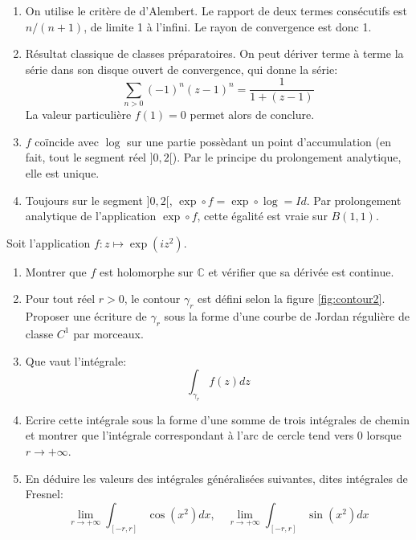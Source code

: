 \documentclass[a4paper, 12pt]{amsart}
\begin{document}
\begin{enumerate}
 \item On utilise le critère de d'Alembert. Le rapport de deux termes
consécutifs est $n/(n+1)$, de limite 1 à l'infini. Le rayon de convergence est
donc 1.
\item Résultat classique de classes préparatoires. On peut dériver terme à
terme la série dans son disque ouvert de convergence, qui donne la série:
\[
\sum_{n >0}(-1)^{n} (z-1)^n = \frac{1}{1+(z-1)}
\]
La valeur particulière $f(1)=0$ permet alors de conclure.
\item $f$ coïncide avec $\log$ sur une partie possèdant un point d'accumulation
(en fait, tout le segment réel $]0,2[$). Par le principe du prolongement
analytique, elle est unique.
\item Toujours sur le segment $]0,2[$, $\exp \circ f = \exp \circ \log = Id$.
Par prolongement analytique de l'application $\exp \circ f$, cette égalité est
vraie sur $B(1,1)$.
\end{enumerate}
\begin{fex}
 Soit l'application $f \colon z \mapsto \exp\left(i z^2\right)$. 
\begin{enumerate}
  \item Montrer que $f$ est holomorphe sur $\mathbb{C}$ et vérifier que sa
  dérivée est continue.
  \item Pour tout réel $r > 0$, le contour $\gamma_r$ est défini selon la figure
  \ref{fig:contour2}. Proposer une écriture de $\gamma_r$ sous la forme d'une
  courbe de Jordan régulière de classe $C^1$ par morceaux.
  \item Que vaut l'intégrale:
  \[
  \int_{\gamma_r} f(z) dz
  \]
  \item Ecrire cette intégrale sous la forme d'une somme de trois
  intégrales de chemin et montrer que l'intégrale correspondant à l'arc de
  cercle tend vers 0 lorsque $r \to +\infty$.
  \item En déduire les valeurs des intégrales généralisées suivantes, dites
  intégrales de Fresnel:
  \[
  \lim_{r \to +\infty} \int_{[-r,r]} \cos(x^2) dx, \quad  \lim_{r \to +\infty}
  \int_{[-r,r]} \sin(x^2) dx
  \]
\end{enumerate}
\end{fex}
\end{document}
